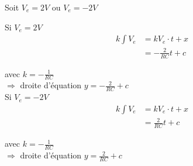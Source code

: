 Soit $V_e=2V$ ou $V_e=-2V$

Si $V_e=2V$ \\

\begin{align}
k \int V_e &= k V_e\cdot t + x\\
&= - \frac{2}{RC}t+c 
\end{align}

avec $k=-\frac{1}{RC} $ \\

$\Rightarrow$ droite d'équation $y=-\frac{2}{RC}+c$ \\


Si $V_e=-2V$ \\

\begin{align}
k \int V_e &= k V_e\cdot t + x \\
&= \frac{2}{RC}t+c 
\end{align}

avec $k=-\frac{1}{RC} $ \\

$\Rightarrow$ droite d'équation $y=\frac{2}{RC}+c$

